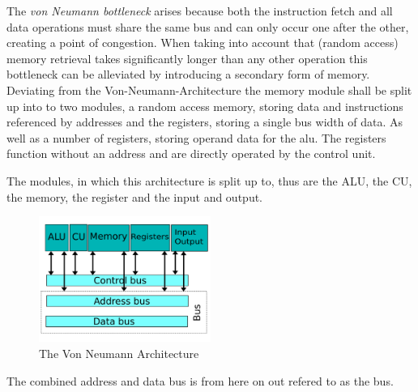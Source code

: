 The \textit{von Neumann bottleneck} arises because both the instruction fetch and all data operations must share the same bus and can only occur one after the other, creating a point of congestion. When taking into account that (random access) memory retrieval takes significantly longer than any other operation this bottleneck can be alleviated by introducing a secondary form of memory. Deviating from the Von-Neumann-Architecture the memory module shall be split up into to two modules, a random access memory, storing data and instructions referenced by addresses and the registers, storing a single bus width of data. As well as a number of registers, storing operand data for the alu. The registers function without an address and are directly operated by the control unit.

The modules, in which this architecture is split up to, thus are the ALU, the CU, the memory, the register and the input and output. 

\begin{figure}[H]
  \begin{center}
    \includegraphics[width=0.5\textwidth]{figures/VNA-Adapted}
  \end{center}
  \caption{The Von Neumann Architecture \cite{fig-vna}}\label{fig:vna-adapted}
\end{figure}

The combined address and data bus is from here on out refered to as the bus.

